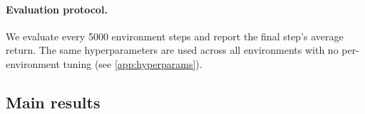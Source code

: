 \documentclass{article}
\theoremstyle{plain}
\theoremstyle{definition}
\theoremstyle{remark}
\begin{document}
\paragraph{Evaluation protocol.}
We evaluate every 5000 environment steps and report the final step's average return.
The same hyperparameters are used across all environments with no per-environment tuning (see \cref{app:hyperparams}).

\subsection{Main results}
\label{sec:main-results}

\begin{table}[t]
  \caption{Final episode return on MuJoCo benchmarks (mean $\pm$ 90\% CI). Values are the final evaluation point of a $10^6$ step training run. Baselines from \citet{lsac2025} use 10 seeds; MGMD uses 10 seeds on HalfCheetah and 1 seed elsewhere ($^\dagger$). Bold indicates best.}
  \label{tab:main-results}
  \vskip 0.1in
  \begin{center}
  \begin{small}
  \end{small}
  \end{center}
  \vskip -0.1in
\end{table}
\end{document}
